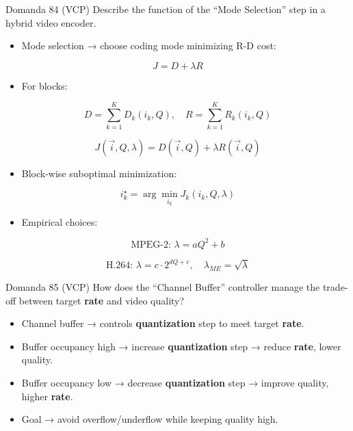 \begin{questionbox}{Domanda 84}
(VCP) Describe the function of the “Mode Selection” step in a hybrid video encoder.
\end{questionbox}


\begin{itemize}
  \item Mode selection → choose coding mode minimizing R-D cost:
\end{itemize}


$$
J = D+\lambda R
$$


\begin{itemize}
  \item For blocks:
\end{itemize}


$$
D=\sum_{k=1}^{K}D_k(i_k,Q),
\quad
R=\sum_{k=1}^{K}R_k(i_k,Q)
$$



$$
J(\vec{i},Q,\lambda)=D(\vec{i},Q)+\lambda R(\vec{i},Q)
$$


\begin{itemize}
  \item Block-wise suboptimal minimization:
\end{itemize}


$$
i_k^\star=\arg\min_{i_k}J_k(i_k,Q,\lambda)
$$


\begin{itemize}
  \item Empirical choices:
\end{itemize}


$$
\text{MPEG-2: } \lambda=aQ^2+b
$$



$$
\text{H.264: } \lambda=c\cdot2^{dQ+e},
\quad
\lambda_{ME}=\sqrt{\lambda}
$$




\begin{questionbox}{Domanda 85}
(VCP) How does the “Channel Buffer” controller manage the trade-off between target \textbf{rate} and video quality?
\end{questionbox}


\begin{itemize}
  \item Channel buffer → controls \textbf{quantization} step to meet target \textbf{rate}.
  \item Buffer occupancy high → increase \textbf{quantization} step → reduce \textbf{rate}, lower quality.
  \item Buffer occupancy low → decrease \textbf{quantization} step → improve quality, higher \textbf{rate}.
  \item Goal → avoid overflow/underflow while keeping quality high.
\end{itemize}



